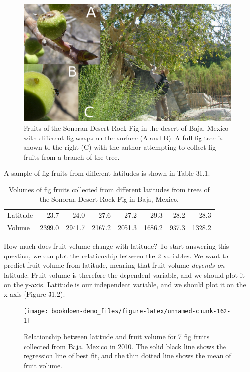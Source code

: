 \documentclass[
]{scrbook}
\begin{document}
\begin{figure}
\includegraphics[width=1\linewidth]{img/FigTree2} \caption{Fruits of the Sonoran Desert Rock Fig in the desert of Baja, Mexico with different fig wasps on the surface (A and B). A full fig tree is shown to the right (C) with the author attempting to collect fig fruits from a branch of the tree.}\label{fig:unnamed-chunk-160}
\end{figure}

A sample of fig fruits from different latitudes is shown in Table 31.1.

\begin{longtable}[]{@{}lrrrrrrr@{}}
\caption{\label{tab:unnamed-chunk-161}Volumes of fig fruits collected from different latitudes from trees of the Sonoran Desert Rock Fig in Baja, Mexico.}\tabularnewline
\toprule
\endhead
Latitude & 23.7 & 24.0 & 27.6 & 27.2 & 29.3 & 28.2 & 28.3 \\
Volume & 2399.0 & 2941.7 & 2167.2 & 2051.3 & 1686.2 & 937.3 & 1328.2 \\
\bottomrule
\end{longtable}

How much does fruit volume change with latitude?
To start answering this question, we can plot the relationship between the 2 variables.
We want to predict fruit volume from latitude, meaning that fruit volume \emph{depends on} latitude.
Fruit volume is therefore the dependent variable, and we should plot it on the y-axis.
Latitude is our independent variable, and we should plot it on the x-axis (Figure 31.2).

\begin{figure}
\texttt{[image: bookdown-demo\_files/figure-latex/unnamed-chunk-162-1]} \caption{Relationship between latitude and fruit volume for 7 fig fruits collected from Baja, Mexico in 2010. The solid black line shows the regression line of best fit, and the thin dotted line shows the mean of fruit volume.}\label{fig:unnamed-chunk-162}
\end{figure}
\end{document}
